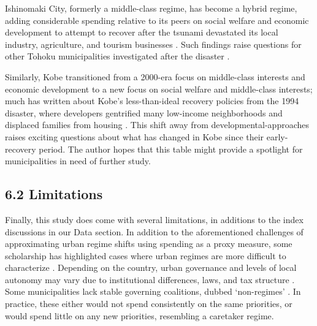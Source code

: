 \documentclass[preprint, 3p,
authoryear]{elsarticle} %
\begin{document}
Ishinomaki City, formerly a middle-class regime, has become a hybrid
regime, adding considerable spending relative to its peers on social
welfare and economic development to attempt to recover after the tsunami
devastated its local industry, agriculture, and tourism businesses
\citep{dimmer_and_lindenberg_2014, matthews_2017, ji_and_imai_2022}.
Such findings raise questions for other Tohoku municipalities
investigated after the disaster \citep{aldrich_2019, cheek_2020}.

Similarly, Kobe transitioned from a 2000-era focus on middle-class
interests and economic development \citep{nunokawa_2007, funck_2007} to
a new focus on social welfare and middle-class interests; much has
written about Kobe's less-than-ideal recovery policies from the 1994
disaster, where developers gentrified many low-income neighborhoods and
displaced families from housing
\citep{yasui_2007, edgington_2010, aldrich_2012, maly_2012}. This shift
away from developmental-approaches raises exciting questions about what
has changed in Kobe since their early-recovery period. The author hopes
that this table might provide a spotlight for municipalities in need of
further study.

\hypertarget{limitations}{%
\subsection{6.2 Limitations}\label{limitations}}

Finally, this study does come with several limitations, in additions to
the index discussions in our Data section. In addition to the
aforementioned challenges of approximating urban regime shifts using
spending as a proxy measure, some scholarship has highlighted cases
where urban regimes are more difficult to characterize
\citep{deleon_1992, shin_et_al_2015, davies_and_blanco_2017, russo_and_scarnato_2018}.
Depending on the country, urban governance and levels of local autonomy
may vary due to institutional differences, laws, and tax structure
\citep{sellers_2002, sorensen_2011}. Some municipalities lack stable
governing coalitions, dubbed `non-regimes' \citep{mossberger_2009}. In
practice, these either would not spend consistently on the same
priorities, or would spend little on any new priorities, resembling a
caretaker regime.
\end{document}
